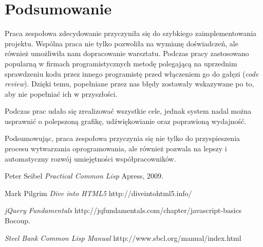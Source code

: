 \section{Podsumowanie}
Praca zespołowa zdecydowanie przyczyniła się do szybkiego zaimplementowania projektu. Wspólna praca nie tylko pozwoliła na wymianę doświadczeń, ale również umożliwiła nam dopracowanie warsztatu. Podczas pracy zastosowano popularną w firmach programistycznych metodę polegającą na uprzednim sprawdzeniu kodu przez innego programistę przed włączeniem go do gałęzi (\emph{code review}). Dzięki temu, popełniane przez nas błędy zostawały wskazywane po to, aby nie popełniać ich w przyszłości.

Podczas prac udało się zrealizować wszystkie cele, jednak system nadal można usprawnić o polepszoną grafikę, udźwiękowianie oraz poprawioną wydajność.

Podsumowując, praca zespołowa przyczynia się nie tylko do przyspieszenia procesu wytwarzania oprogramowania, ale również pozwala na lepszy i automatyczny rozwój umiejętności współpracowników.
\pagebreak

\begin{thebibliography}{9}
  Peter Seibel
  \emph{Practical Common Lisp}
  Apress,
  2009.

  Mark Pilgrim
  \emph{Dive into HTML5}
  http://diveintohtml5.info/


  \emph{jQuery Fundamentals}
  http://jqfundamentals.com/chapter/javascript-basics
  Bocoup.

  \emph{Steel Bank Common Lisp Manual}
  http://www.sbcl.org/manual/index.html

\end{thebibliography}


